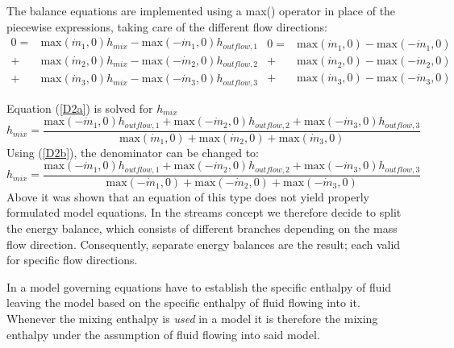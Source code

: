 The balance equations are implemented using a max() operator in place of
the piecewise expressions, taking care of the different flow directions:
\begin{subequations}
\begin{equation}
\begin{split}
0=&\text{max}(\dot{m}_1,0)h_{mix}-\text{max}(-\dot{m}_1,0)h_{outflow,1}\\
+&\text{max}(\dot{m}_2,0)h_{mix}-\text{max}(-\dot{m}_2,0)h_{outflow,2}\\
+&\text{max}(\dot{m}_3,0)h_{mix}-\text{max}(-\dot{m}_3,0)h_{outflow,3}
\end{split}
\label{D2a}
\end{equation}

\begin{equation}
\begin{split}
0=&\text{max}(\dot{m}_1,0)-\text{max}(-\dot{m}_1,0)\\
+&\text{max}(\dot{m}_2,0)-\text{max}(-\dot{m}_2,0)\\
+&\text{max}(\dot{m}_3,0)-\text{max}(-\dot{m}_3,0)
\end{split}
\label{D2b}
\end{equation}
\label{D2}
\end{subequations}

Equation (\ref{D2a}) is solved for $h_{mix}$
\begin{equation*}
h_{mix}=\frac{\text{max}(-\dot{m}_1,0)h_{outflow,1}+\text{max}(-\dot{m}_2,0)h_{outflow,2}+\text{max}(-\dot{m}_3,0)h_{outflow,3}}
{\text{max}(\dot{m}_1,0)+\text{max}(\dot{m}_2,0)+\text{max}(\dot{m}_3,0)}
\end{equation*}
Using (\ref{D2b}), the denominator can be changed to:
\begin{equation*}
h_{mix}=\frac{\text{max}(-\dot{m}_1,0)h_{outflow,1}+\text{max}(-\dot{m}_2,0)h_{outflow,2}+\text{max}(-\dot{m}_3,0)h_{outflow,3}}
{\text{max}(-\dot{m}_1,0)+\text{max}(-\dot{m}_2,0)+\text{max}(-\dot{m}_3,0)}
\end{equation*}
Above it was shown that an equation of this type does not yield properly
formulated model equations. In the streams concept we therefore decide
to split the energy balance, which consists of different branches
depending on the mass flow direction. Consequently, separate energy
balances are the result; each valid for specific flow directions.

In a model governing equations have to establish the specific enthalpy
of fluid leaving the model based on the specific enthalpy of fluid
flowing into it. Whenever the mixing enthalpy is \emph{used} in a model
it is therefore the mixing enthalpy under the assumption of fluid
flowing into said model.

